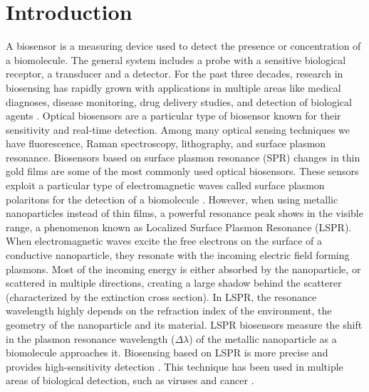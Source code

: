 \chapter{Introduction} \label{chap:intro}

A biosensor is a measuring device used to detect the presence or concentration of a biomolecule. The general system includes 
a probe with a sensitive biological receptor, a transducer and a detector. For the past three decades, research in biosensing 
has rapidly grown with applications in multiple areas like medical diagnoses, disease monitoring, drug delivery studies, 
and detection of biological agents \cite{Turner2000, Mohanty2006, Mehrotra2016}. Optical biosensors are a particular type of biosensor 
known for their sensitivity and real-time detection. Among many optical sensing techniques we have fluorescence, Raman spectroscopy, lithography, 
and surface plasmon resonance. Biosensors based on surface plasmon resonance (SPR) changes in thin gold films are some of the most 
commonly used optical biosensors.  These sensors exploit a particular type of electromagnetic waves called surface plasmon polaritons for the
detection of a biomolecule \cite{Homola2008}. However, when using metallic nanoparticles instead of thin films, a powerful resonance peak 
shows in the visible range, a phenomenon known as Localized Surface Plasmon Resonance (LSPR). When electromagnetic waves excite the free electrons on 
the surface of a conductive nanoparticle, they resonate with the incoming electric field forming plasmons. Most of the incoming energy is either 
absorbed by the nanoparticle, or scattered in multiple directions, creating a large shadow behind the scatterer (characterized by the extinction cross section). In LSPR, 
the resonance wavelength highly depends on the refraction index of the environment, the geometry of the nanoparticle and its material. LSPR biosensors measure 
the shift in the plasmon resonance wavelength ($\Delta\lambda$) of the metallic nanoparticle as a biomolecule approaches it. Biosensing based on LSPR 
is more precise and provides high-sensitivity detection \cite{Sepulveda2009}. This technique has been used in multiple areas of biological detection, 
such as viruses and cancer \cite{Wang2010, Liu2014, Zhu2016}. 

